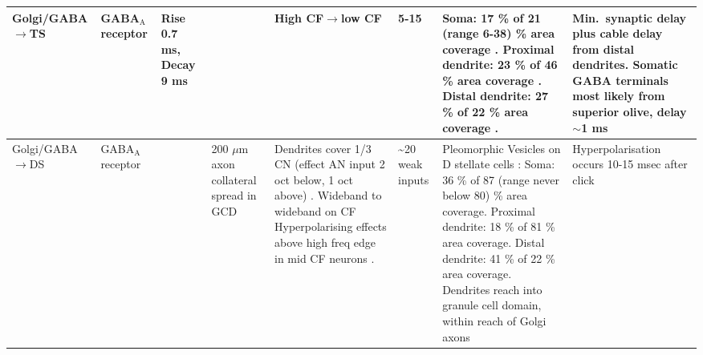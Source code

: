 \begin{longtable}{XXXXXXXX}
Golgi/GABA \ensuremath{\rightarrow}TS                         
&%
GABA$_{\textrm{A}}$ receptor  \citep[bicuculine-sensitive VCN T stellate cell, mouse slice preparation][]{FerragamoGoldingEtAl:1998} \citep[Chinchilla][]{JosephsonMorest:1998}
& %
Rise 0.7 ms, Decay 9 ms  \citep[probably a combination of two decay time constants, fast 5-10 slow 20-60][]{AwatramaniTurecekEtAl:2005}                     
& %
& %
High CF\ensuremath{\rightarrow}low CF \citep[Chinchilla][]{JosephsonMorest:1998}                        
& %
5-15 \citep[Estimate, cat][]{SmithRhode:1989}     
& %
Soma: 17 \%  of 21 (range 6-38) \% area coverage   \citep[Flat vesicles,cat][]{SmithRhode:1989}. 
Proximal dendrite: 23 \%  of 46 \% area coverage   \citep[cat][]{SmithRhode:1989}. 
Distal dendrite: 27 \%  of 22 \% area coverage   \citep[cat][]{SmithRhode:1989}. 
& %
Min.\ synaptic delay plus cable delay from distal dendrites.
Somatic GABA terminals most likely from superior olive, delay $\sim$1 ms
\\ \midrule
Golgi/GABA  \ensuremath{\rightarrow}DS                         
& %
GABA$_{\textrm{A}}$ receptor \citep{EvansZhao:1998,FerragamoGoldingEtAl:1998a,Mugnaini:1985,MugnainiOsenEtAl:1980,SaintMorestEtAl:1989}                           
& %
& %
200 $\mu$m axon collateral spread in GCD \citep{FerragamoGoldingEtAl:1998}
& %
Dendrites cover 1/3 CN (effect AN input 2 oct below, 1 oct above) \citep[guinea pig][]{PalmerJiangEtAl:1996}.
Wideband to wideband on CF \citep{EvansZhao:1998} 
Hyperpolarising effects above high freq edge in mid CF neurons \citep[rat][]{PaoliniClark:1999}.                    
& %
\~{}20 weak inputs\citep{SaintMorestEtAl:1989}                     
& %
Pleomorphic Vesicles on D stellate cells \citep[cat][]{SmithRhode:1989}:
Soma: 36 \%  of 87 (range never below 80) \% area coverage. 
Proximal dendrite: 18 \%  of 81 \% area coverage.  
Distal dendrite: 41 \%  of 22 \% area coverage.   
Dendrites reach into granule cell domain, within reach of Golgi axons \citep{OertelWuEtAl:1990,ArnottWallaceEtAl:2004}     
& %
Hyperpolarisation occurs 10-15 msec after click \citep{PaoliniClark:1999}
\\ \midrule

\end{longtable}





